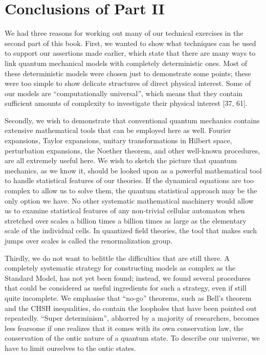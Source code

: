 \documentclass[main.tex]{subfiles}
\begin{document}
\section{Conclusions of Part II}\label{ch23}

We had three reasons for working out many of our technical exercises in the second part of this book. First, we wanted to show what techniques can be used to support our assertions made earlier, which state that there are many ways to link quantum mechanical models with completely deterministic ones. Most of these deterministic models were chosen just to demonstrate some points; these were too simple to show delicate structures of direct physical interest. Some of our models are “computationally universal”, which means that they contain sufficient amounts of complexity to investigate their physical interest [37, 61].

Secondly, we wish to demonstrate that conventional quantum mechanics contains extensive mathematical tools that can be employed here as well. Fourier expansions, Taylor expansions, unitary transformations in Hilbert space, perturbation expansions, the Noether theorem, and other well-known procedures, are all extremely useful here. We wish to sketch the picture that quantum mechanics, as we know it, should be looked upon as a powerful mathematical tool to handle statistical features of our theories. If the dynamical equations are too complex to allow us to solve
them, the quantum statistical approach may be the only option we have. No other systematic mathematical machinery would allow us to examine statistical features of any non-trivial cellular automaton when stretched over scales a billion times a billion times as large as the elementary scale of the individual cells. In quantized field theories, the tool that makes such jumps over scales is called the renormalization group.

Thirdly, we do not want to belittle the difficulties that are still there. A completely systematic strategy for constructing models as complex as the Standard Model, has not yet been found; instead, we found several procedures that could be considered as useful ingredients for such a strategy, even if still quite incomplete. We emphasise that “no-go” theorems, such as Bell’s theorem and the CHSH inequalities, do contain the loopholes that have been pointed out repeatedly. “Super determinism”, abhorred by a majority of researchers, becomes less fearsome if one realizes that it comes with its own conservation law, the conservation of the ontic nature of a quantum state. To describe our universe, we have to limit ourselves to the ontic states. 
\end{document}
